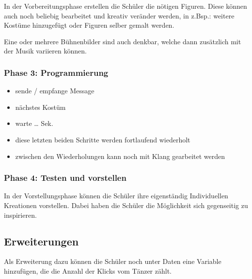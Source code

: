 In der Vorbereitungsphase erstellen die Schüler die nötigen Figuren.
Diese können auch noch beliebig bearbeitet und kreativ veränder werden,
in z.Bsp.: weitere Kostüme hinzugefügt oder Figuren selber gemalt
werden.

Eine oder mehrere Bühnenbilder sind auch denkbar, welche dann zusätzlich
mit der Musik variieren können.

\subsubsection{Phase 3: Programmierung}\label{phase-3-programmierung}

\begin{itemize}
\item
  sende / empfange Message
\item
  nächstes Kostüm
\item
  warte \ldots{} Sek.
\item
  diese letzten beiden Schritte werden fortlaufend wiederholt
\item
  zwischen den Wiederholungen kann noch mit Klang gearbeitet werden
\end{itemize}

\subsubsection{Phase 4: Testen und
vorstellen}\label{phase-4-testen-und-vorstellen}

In der Vorstellungsphase können die Schüler ihre eigenständig
Individuellen Kreationen vorstellen. Dabei haben die Schüler die
Möglichkeit sich gegenseitig zu inspirieren.

\subsection{Erweiterungen}\label{erweiterungen}

Als Erweiterung dazu können die Schüler noch unter Daten eine Variable
hinzufügen, die die Anzahl der Klicks vom Tänzer zählt.
